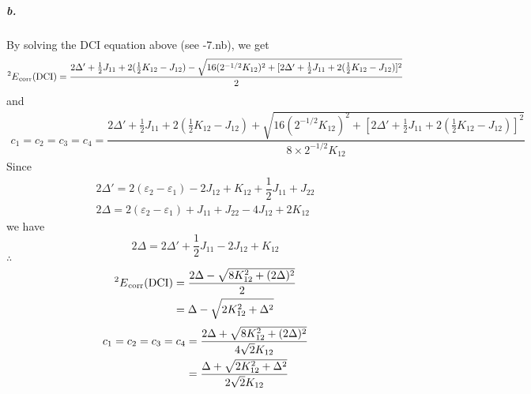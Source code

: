 \documentclass[a4paper]{article}
\DeclareMathOperator{\corr}{\mathrm{corr}}
\newcommand{\subex}[1]{\subparagraph{#1}}
\numberwithin{equation}{subsection}
\newcommand{\code}[1]{\colorbox{codegray}{{\Consolas#1}}}
\begin{document}
\subex{b.}
By solving the DCI equation above (see \code{5-7.nb}), we get
\begin{align}
{^2 E}_{\corr}(\text{DCI}) &= \dfrac{2\Delta' + \tfrac{1}{2}J_{11} + 2(\tfrac{1}{2}K_{12} - J_{12}) - \sqrt{16(2^{-1/2}K_{12})^2 + [2\Delta' + \tfrac{1}{2}J_{11} + 2(\tfrac{1}{2}K_{12} - J_{12})]^2}}{2} \notag\\
\end{align}
and
\begin{align}
c_1 = c_2 = c_3 = c_4 = \dfrac{2\Delta' + \tfrac{1}{2}J_{11} + 2(\tfrac{1}{2}K_{12} - J_{12}) + \sqrt{16(2^{-1/2}K_{12})^2 + [2\Delta' + \tfrac{1}{2}J_{11} + 2(\tfrac{1}{2}K_{12} - J_{12})]^2}}{8\times 2^{-1/2}K_{12}}
\end{align}
Since
\begin{align}
2\Delta' = 2(\varepsilon_2 - \varepsilon_1) - 2J_{12} + K_{12} + \dfrac{1}{2}J_{11} + J_{22} \\
2\Delta = 2(\varepsilon_2 - \varepsilon_1) + J_{11} + J_{22} - 4J_{12} + 2K_{12}
\end{align}
we have
\begin{equation}\label{key}
2\Delta = 2\Delta' + \dfrac{1}{2}J_{11} - 2J_{12} + K_{12}
\end{equation}
$ \therefore $
\begin{align}
{^2 E}_{\corr}(\text{DCI}) &= \dfrac{2\Delta - \sqrt{8K_{12}^2 + (2\Delta)^2}}{2} \notag\\
&= \Delta - \sqrt{2K_{12}^2 + \Delta^2}
\end{align}
\begin{align}
c_1 = c_2 = c_3 = c_4  &= \dfrac{2\Delta + \sqrt{8K_{12}^2 + (2\Delta)^2}}{4\sqrt{2}K_{12}} \notag\\
&= \dfrac{\Delta + \sqrt{2K_{12}^2 + \Delta^2}}{2\sqrt{2}K_{12}}
\end{align}
\end{document}
